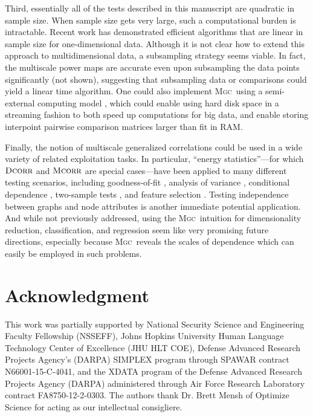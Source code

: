 \documentclass[11pt]{article}
\providecommand{\sct}[1]{{\normalfont\textsc{#1}}}
\newcommand{\Mgc}{\sct{Mgc}}
\newcommand{\Dcorr}{\sct{Dcorr}}
\newcommand{\Mcorr}{\sct{Mcorr}}
\begin{document}
Third, essentially all of the tests described in this manuscript are quadratic in sample size.  When sample size gets very large, such a computational burden is intractable.  Recent work has demonstrated efficient algorithms that are linear in sample size \cite{Huo2016} for one-dimensional data.  Although it is not clear how to extend this approach to multidimensional data, a subsampling strategy seems viable.  In fact, the multiscale power maps are accurate even upon subsampling the data points significantly (not shown), suggesting that subsampling data or comparisons  could yield a linear time algorithm.  One could also implement \Mgc~using a semi-external computing model \cite{Zheng2016},  which could enable using hard disk space in a streaming fashion to both speed up computations for big data, and enable storing interpoint pairwise comparison matrices larger than fit in RAM.

Finally, the notion of multiscale generalized correlations could be used in a wide variety of related exploitation tasks.  In particular, ``energy statistics''---for which $\Dcorr$ and $\Mcorr$ are special cases---have been applied to many different testing scenarios, including goodness-of-fit  \cite{Szekely2005}, analysis of variance  \cite{Rizzo2010}, conditional dependence  \cite{Szekely2014,Wang2015},  two-sample tests \cite{Szekely2004}, and feature selection \cite{LiZhongZhu2012,Zhong2015}.   
Testing independence between graphs and node attributes \cite{Fosdick2015} is another immediate potential application.  And while not previously addressed, using the \Mgc~intuition for dimensionality reduction, classification, and regression seem like very promising future directions, especially because \Mgc~reveals the scales of dependence which can easily be employed in such problems.








\section*{Acknowledgment}
This work was partially supported by
%
National Security Science and Engineering Faculty Fellowship (NSSEFF),
%
Johns Hopkins University Human Language Technology Center of Excellence (JHU HLT COE),
%
Defense Advanced Research Projects Agency's (DARPA) SIMPLEX program through SPAWAR contract N66001-15-C-4041,
%
and the XDATA program of the Defense Advanced Research Projects Agency (DARPA) administered through Air Force Research Laboratory contract FA8750-12-2-0303. The authors thank Dr. Brett Mensh of Optimize Science for acting as our intellectual consigliere.
\end{document}
